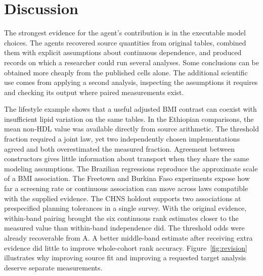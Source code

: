 \documentclass[sigconf,anonymous,review]{acmart}
\begin{document}
\section{Discussion}
The strongest evidence for the agent's contribution is in the executable model choices. The agents recovered source quantities from original tables, combined them with explicit assumptions about continuous dependence, and produced records on which a researcher could run several analyses. Some conclusions can be obtained more cheaply from the published cells alone. The additional scientific use comes from applying a second analysis, inspecting the assumptions it requires and checking its output where paired measurements exist.

The lifestyle example shows that a useful adjusted BMI contrast can coexist with insufficient lipid variation on the same tables. In the Ethiopian comparisons, the mean non-HDL value was available directly from source arithmetic. The threshold fraction required a joint law, yet two independently chosen implementations agreed and both overestimated the measured fraction. Agreement between constructors gives little information about transport when they share the same modeling assumptions. The Brazilian regressions reproduce the approximate scale of a BMI association. The Freetown and Burkina Faso experiments expose how far a screening rate or continuous association can move across laws compatible with the supplied evidence. The CHNS holdout supports two associations at prespecified planning tolerances in a single survey. With the original evidence, within-band pairing brought the six continuous rank estimates closer to the measured value than within-band independence did. The threshold odds were already recoverable from A. A better middle-band estimate after receiving extra evidence did little to improve whole-cohort rank accuracy. Figure~\ref{fig:revision} illustrates why improving source fit and improving a requested target analysis deserve separate measurements.
\end{document}
